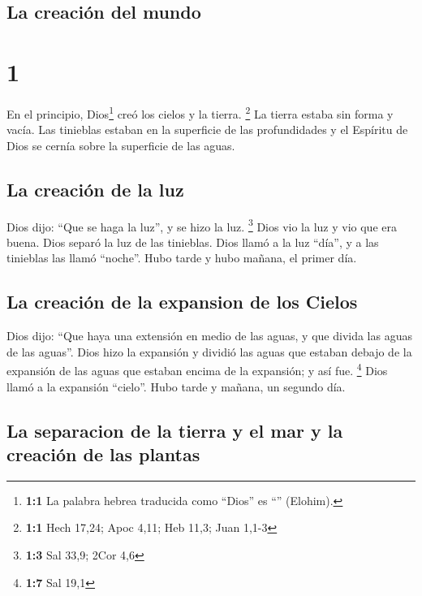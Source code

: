 \hypertarget{la-creaciuxf3n-del-mundo}{%
\subsection{La creación del mundo}\label{la-creaciuxf3n-del-mundo}}

\hypertarget{section}{%
\section{1}\label{section}}

 En el principio, Dios\footnote{\textbf{1:1} La palabra
  hebrea traducida como ``Dios'' es ``'' (Elohim).} creó
los cielos y la tierra. \footnote{\textbf{1:1} Hech 17,24; Apoc 4,11;
  Heb 11,3; Juan 1,1-3}  La tierra estaba sin forma y
vacía. Las tinieblas estaban en la superficie de las profundidades y el
Espíritu de Dios se cernía sobre la superficie de las aguas.

\hypertarget{la-creaciuxf3n-de-la-luz}{%
\subsection{La creación de la luz}\label{la-creaciuxf3n-de-la-luz}}

 Dios dijo: ``Que se haga la luz'', y se hizo la luz.
\footnote{\textbf{1:3} Sal 33,9; 2Cor 4,6}  Dios vio la
luz y vio que era buena. Dios separó la luz de las tinieblas.
 Dios llamó a la luz ``día'', y a las tinieblas las llamó
``noche''. Hubo tarde y hubo mañana, el primer día.

\hypertarget{la-creaciuxf3n-de-la-expansion-de-los-cielos}{%
\subsection{La creación de la expansion de los
Cielos}\label{la-creaciuxf3n-de-la-expansion-de-los-cielos}}

 Dios dijo: ``Que haya una extensión en medio de las
aguas, y que divida las aguas de las aguas''.  Dios hizo
la expansión y dividió las aguas que estaban debajo de la expansión de
las aguas que estaban encima de la expansión; y así fue. \footnote{\textbf{1:7}
  Sal 19,1}  Dios llamó a la expansión ``cielo''. Hubo
tarde y mañana, un segundo día.

\hypertarget{la-separacion-de-la-tierra-y-el-mar-y-la-creaciuxf3n-de-las-plantas}{%
\subsection{La separacion de la tierra y el mar y la creación de las
plantas}\label{la-separacion-de-la-tierra-y-el-mar-y-la-creaciuxf3n-de-las-plantas}}

